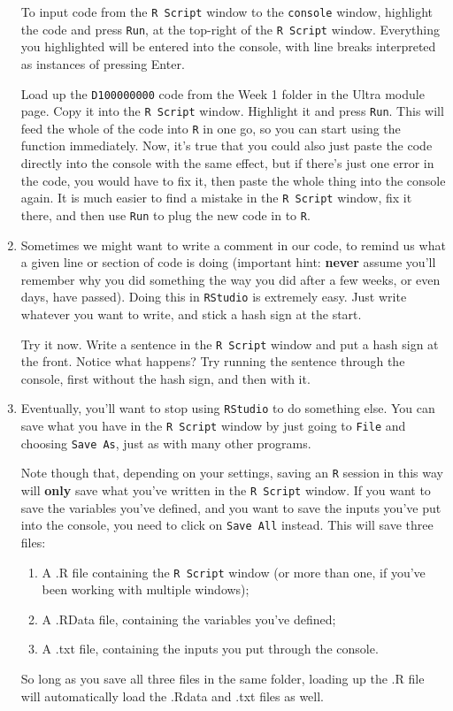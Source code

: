 \documentclass[11pt,a4paper]{article}
\begin{document}
\begin{enumerate}
To input code from the \texttt{R Script} window to the \texttt{console} window, highlight the code and press \texttt{Run}, at the top-right of the \texttt{R Script} window. Everything you highlighted will be entered into the console, with line breaks interpreted as instances of pressing Enter.

Load up the \texttt{D100000000} code from the Week 1 folder in the Ultra module page. Copy it into the \texttt{R Script} window. Highlight it and press \texttt{Run}. This will feed the whole of the code into \texttt{R} in one go, so you can start using the function immediately. Now, it's true that you could also just paste the code directly into the console with the same effect, but if there's just one error in the code, you would have to fix it, then paste the whole thing into the console again. It is much easier to find a mistake in the \texttt{R Script} window, fix it there, and then use \texttt{Run} to plug the new code in to \texttt{R}.

\item Sometimes we might want to write a comment in our code, to remind us what a given line or section of code is doing (important hint: \textbf{never} assume you'll remember why you did something the way you did after a few weeks, or even days, have passed). Doing this in \texttt{RStudio} is extremely easy. Just write whatever you want to write, and stick a hash sign at the start.

Try it now. Write a sentence in the \texttt{R Script} window and put a hash sign at the front. Notice what happens? Try running the sentence through the console, first without the hash sign, and then with it.

\item Eventually, you'll want to stop using \texttt{RStudio} to do something else. You can save what you have in the \texttt{R Script} window by just going to \texttt{File} and choosing \texttt{Save As}, just as with many other programs.

Note though that, depending on your settings, saving an \texttt{R} session in this way will \textbf{only} save what you've written in the \texttt{R Script} window. If you want to save the variables you've defined, and you want to save the inputs you've put into the console, you need to click on \texttt{Save All} instead. This will save three files:
\begin{enumerate}
    \item A .R file containing the \texttt{R Script} window (or more than one, if you've been working with multiple windows);
    \item A .RData file, containing the variables you've defined;
    \item A .txt file, containing the inputs you put through the console.
\end{enumerate}
So long as you save all three files in the same folder, loading up the .R file will automatically load the .Rdata and .txt files as well.

\end{enumerate}
\end{document}

